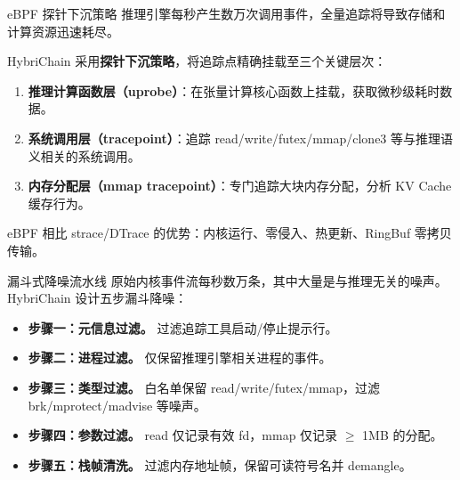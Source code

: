 \documentclass[aspectratio=169, 10pt]{beamer}
\begin{document}
\begin{frame}{eBPF 探针下沉策略}
    推理引擎每秒产生数万次调用事件，全量追踪将导致存储和计算资源迅速耗尽。

    HybriChain 采用\textbf{探针下沉策略}，将追踪点精确挂载至三个关键层次：

    \begin{enumerate}[(1)]
        \item \textbf{推理计算函数层（uprobe）}：在张量计算核心函数上挂载，获取微秒级耗时数据。
        \item \textbf{系统调用层（tracepoint）}：追踪 read/write/futex/mmap/clone3 等与推理语义相关的系统调用。
        \item \textbf{内存分配层（mmap tracepoint）}：专门追踪大块内存分配，分析 KV Cache 缓存行为。
    \end{enumerate}

    \vspace{0.5em}
    eBPF 相比 strace/DTrace 的优势：内核运行、零侵入、热更新、RingBuf 零拷贝传输。
\end{frame}

\begin{frame}{漏斗式降噪流水线}
    原始内核事件流每秒数万条，其中大量是与推理无关的噪声。HybriChain 设计五步漏斗降噪：

    \begin{itemize}
        \item \textbf{步骤一：元信息过滤。} 过滤追踪工具启动/停止提示行。
        \item \textbf{步骤二：进程过滤。} 仅保留推理引擎相关进程的事件。
        \item \textbf{步骤三：类型过滤。} 白名单保留 read/write/futex/mmap，过滤 brk/mprotect/madvise 等噪声。
        \item \textbf{步骤四：参数过滤。} read 仅记录有效 fd，mmap 仅记录 $\geq$ 1MB 的分配。
        \item \textbf{步骤五：栈帧清洗。} 过滤内存地址帧，保留可读符号名并 demangle。
    \end{itemize}
\end{frame}
\end{document}
